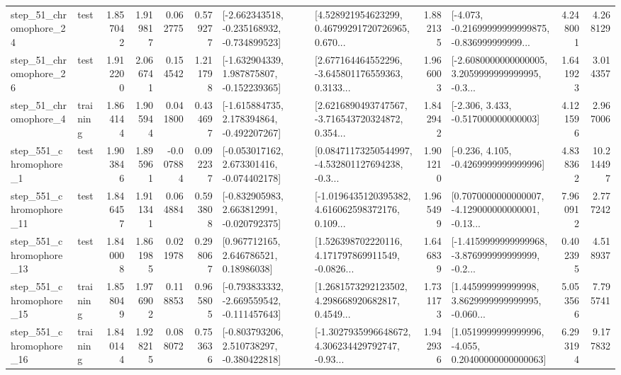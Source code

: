 \begin{tabular}{llrrrrllrlrr}
   step\_51\_chromophore\_24 &      test &      1.857042 &    1.919817 &      0.062775 &  0.579277 &  [-2.662343518, -0.235168932, -0.734899523] &  [4.528921954623299, 0.46799291720726965, 0.670... &       1.882135 &  [-4.073, -0.21699999999999875, -0.836999999999... &            4.248001 &          4.268129 \\
   step\_51\_chromophore\_26 &      test &      1.912200 &    2.066741 &      0.154542 &  1.211798 &   [-1.632904339, 1.987875807, -0.152239365] &  [2.677164464552296, -3.645801176559363, 0.3133... &       1.966003 &  [-2.6080000000000005, 3.2059999999999995, -0.3... &            1.641923 &          3.014357 \\
    step\_51\_chromophore\_4 &  training &      1.864144 &    1.905944 &      0.041800 &  0.434697 &   [-1.615884735, 2.178394864, -0.492207267] &  [2.6216890493747567, -3.716543720324872, 0.354... &       1.842942 &                [-2.306, 3.433, -0.517000000000003] &            4.121596 &          2.967006 \\
   step\_551\_chromophore\_1 &      test &      1.903846 &    1.895961 &     -0.007884 &  0.092237 &   [-0.053017162, 2.673301416, -0.074402178] &  [0.08471173250544997, -4.532801127694238, -0.3... &       1.901210 &               [-0.236, 4.105, -0.4269999999999996] &            4.838362 &         10.214497 \\
  step\_551\_chromophore\_11 &      test &      1.846457 &    1.911341 &      0.064884 &  0.593808 &   [-0.832905983, 2.663812991, -0.020792375] &  [-1.0196435120395382, 4.616062598372176, 0.109... &       1.965499 &  [0.7070000000000007, -4.129000000000001, -0.13... &            7.960912 &          2.777242 \\
  step\_551\_chromophore\_13 &      test &      1.840008 &    1.861985 &      0.021978 &  0.298067 &      [0.967712165, 2.646786521, 0.18986038] &  [1.526398702220116, 4.171797869911549, -0.0826... &       1.646839 &  [-1.4159999999999968, -3.876999999999999, -0.2... &            0.402395 &          4.518937 \\
  step\_551\_chromophore\_15 &  training &      1.858049 &    1.976902 &      0.118853 &  0.965805 &  [-0.793833332, -2.669559542, -0.111457643] &  [1.2681573292123502, 4.298668920682817, 0.4549... &       1.731173 &  [1.445999999999998, 3.8629999999999995, -0.060... &            5.053566 &          7.795741 \\
  step\_551\_chromophore\_16 &  training &      1.840144 &    1.928215 &      0.088072 &  0.753636 &   [-0.803793206, 2.510738297, -0.380422818] &  [-1.3027935996648672, 4.306234429792747, -0.93... &       1.942936 &  [1.0519999999999996, -4.055, 0.20400000000000063] &            6.293194 &          9.177832 \\

\end{tabular}
